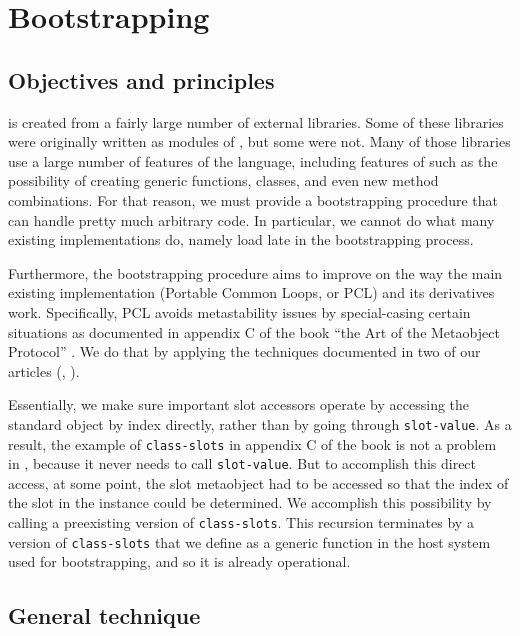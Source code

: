 \chapter{Bootstrapping}

\section{Objectives and principles}

\sysname{} is created from a fairly large number of external
libraries.  Some of these libraries were originally written as modules
of \sysname{}, but some were not.  Many of those libraries use a large
number of features of the \commonlisp{} language, including features
of \clos{} such as the possibility of creating generic functions,
classes, and even new method combinations.  For that reason, we must
provide a bootstrapping procedure that can handle pretty much
arbitrary \commonlisp{} code.  In particular, we cannot do what many
existing \commonlisp{} implementations do, namely load \clos{} late in
the bootstrapping process.

Furthermore, the \sysname{} bootstrapping procedure aims to improve on
the way the main existing \clos{} implementation (Portable Common
Loops, or PCL) and its derivatives work.  Specifically, PCL avoids
metastability issues by special-casing certain situations as
documented in appendix C of the book ``the Art of the Metaobject
Protocol'' \cite{Kiczales:1991:AMP:574212}.  We do that by applying
the techniques documented in two of our articles
(\cite{Strandh:2014:RMI:2635648.2635656}, \cite{durand:hal-02417646}).

Essentially, we make sure important slot accessors operate by
accessing the standard object by index directly, rather than by going
through \texttt{slot-value}.  As a result, the example of
\texttt{class-slots} in appendix C of the book is not a problem in
\sysname{}, because it never needs to call \texttt{slot-value}.  But
to accomplish this direct access, at some point, the slot metaobject
had to be accessed so that the index of the slot in the instance could
be determined.  We accomplish this possibility by calling a
preexisting version of \texttt{class-slots}.  This recursion
terminates by a version of \texttt{class-slots} that we define as a
generic function in the host \commonlisp{} system used for
bootstrapping, and so it is already operational.

\section{General technique}

